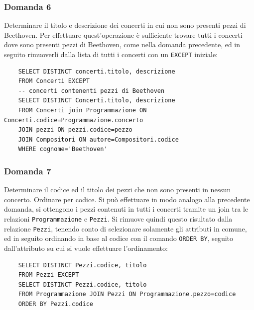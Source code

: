 \documentclass{article}
\begin{document}
\subsubsection*{Domanda 6}
Determinare il titolo e descrizione dei concerti in cui non sono presenti pezzi di Beethoven. Per effettuare quest'operazione è sufficiente trovare tutti i concerti dove sono presenti 
pezzi di Beethoven, come nella domanda precedente, ed in seguito rimuoverli dalla lista di tutti i concerti con un \verb|EXCEPT| iniziale:
\begin{verbatim}
    SELECT DISTINCT concerti.titolo, descrizione
    FROM Concerti EXCEPT
    -- concerti contenenti pezzi di Beethoven
    SELECT DISTINCT Concerti.titolo, descrizione 
    FROM Concerti join Programmazione ON Concerti.codice=Programmazione.concerto
    JOIN pezzi ON pezzi.codice=pezzo
    JOIN Compositori ON autore=Compositori.codice
    WHERE cognome='Beethoven'
\end{verbatim}

\subsubsection*{Domanda 7}
Determinare il codice ed il titolo dei pezzi che non sono presenti in nessun concerto. Ordinare per codice. Si può effettuare in modo analogo alla precedente domanda, si ottengono i pezzi contenuti in tutti i 
concerti tramite un join tra le relazioni \verb|Programmazione| e \verb|Pezzi|. Si rimuove quindi questo risultato dalla relazione \verb|Pezzi|, tenendo conto di selezionare solamente gli attributi in comune, ed 
in seguito ordinando in base al codice con il comando \verb|ORDER BY|, seguito dall'attributo su cui si vuole effettuare l'ordinamento: 
\begin{verbatim}
    SELECT DISTINCT Pezzi.codice, titolo
    FROM Pezzi EXCEPT
    SELECT DISTINCT Pezzi.codice, titolo
    FROM Programmazione JOIN Pezzi ON Programmazione.pezzo=codice
    ORDER BY Pezzi.codice 
\end{verbatim}
\end{document}

